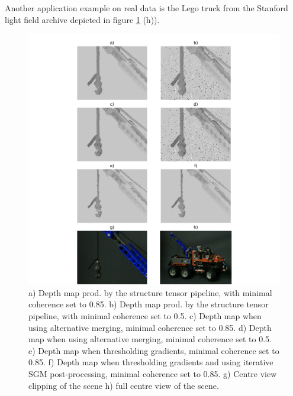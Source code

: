 \documentclass  [
  paper    = a4,
  BCOR     = 10mm,
  twoside,
  fontsize = 12pt,
  fleqn,
  toc      = bibnumbered,
  toc      = listofnumbered,
  numbers  = noendperiod,
  headings = normal,
  listof   = leveldown,
  version  = 3.03
]                                       {scrreprt}
\begin{document}
Another application example on real data is the Lego truck from the Stanford light field archive depicted in figure \ref{fig:truckrealdatasmall} (h)).
\begin{figure}[h!]
	\centering
	\includegraphics[width=1\linewidth]{images/truck_realdata_small.png}
	\caption[Truck clipping with iterative SGM]{a) Depth map prod. by the structure tensor pipeline, with minimal coherence set to 0.85. b) Depth map prod. by the structure tensor pipeline, with minimal coherence set to 0.5. c) Depth map when using alternative merging, minimal coherence set to 0.85. d) Depth map when using alternative merging, minimal coherence set to 0.5. e) Depth map when thresholding gradients, minimal coherence set to 0.85. f) Depth map when thresholding gradients and using iterative SGM post-processing, minimal coherence set to 0.85.  g) Centre view clipping of the scene h) full centre view of the scene.}
	\label{fig:truckrealdatasmall}
\end{figure}
\end{document}
